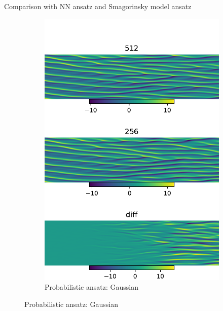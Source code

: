 \documentclass[aspectratio=169]{beamer}
\begin{document}
\begin{frame}{Comparison with NN ansatz and Smagorinsky model ansatz}
\begin{figure}[ht]
\begin{subfigure}[b]{0.32\textwidth}
			\includegraphics[width=\textwidth]{fig/ks_nu0.1_N1512N2256_correct_cmp_lr5e-4.pdf} 
			\caption{Probabilistic ansatz: Gaussian}  
		\end{subfigure}
	\end{figure}
\end{frame}
\end{document}
